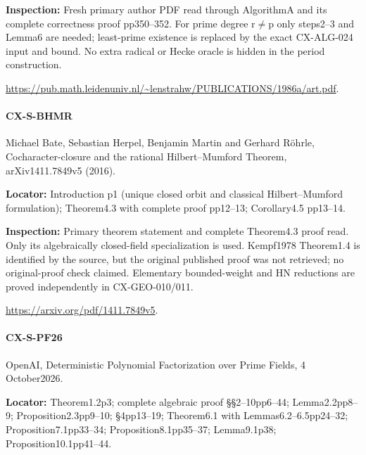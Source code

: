 \documentclass[11pt,a4paper]{article}
\begin{document}
\textbf{Inspection:} Fresh primary author PDF read through AlgorithmA and its complete correctness proof pp350–\allowbreak{}352.\allowbreak{} For prime degree r\ensuremath{\ne}p only steps2–\allowbreak{}3 and Lemma6 are needed; least-prime existence is replaced by the exact CX-ALG-024 input and bound.\allowbreak{} No extra radical or Hecke oracle is hidden in the period construction.\allowbreak{}

\url{https://pub.math.leidenuniv.nl/~lenstrahw/PUBLICATIONS/1986a/art.pdf}.

\paragraph{CX-S-BHMR} Michael Bate, Sebastian Herpel, Benjamin Martin and Gerhard Röhrle, Cocharacter-closure and the rational Hilbert–\allowbreak{}Mumford Theorem, arXiv1411.\allowbreak{}7849v5 (2016).

\textbf{Locator:} Introduction p1 (unique closed orbit and classical Hilbert–\allowbreak{}Mumford formulation); Theorem4.\allowbreak{}3 with complete proof pp12–\allowbreak{}13; Corollary4.\allowbreak{}5 pp13–\allowbreak{}14.

\textbf{Inspection:} Primary theorem statement and complete Theorem4.\allowbreak{}3 proof read.\allowbreak{} Only its algebraically closed-field specialization is used.\allowbreak{} Kempf1978 Theorem1.\allowbreak{}4 is identified by the source, but the original published proof was not retrieved; no original-proof check claimed.\allowbreak{} Elementary bounded-weight and HN reductions are proved independently in CX-GEO-010/\allowbreak{}011.\allowbreak{}

\url{https://arxiv.org/pdf/1411.7849v5}.

\paragraph{CX-S-PF26} OpenAI, Deterministic Polynomial Factorization over Prime Fields, 4 October2026.

\textbf{Locator:} Theorem1.\allowbreak{}2p3; complete algebraic proof §§2–\allowbreak{}10pp6–\allowbreak{}44; Lemma2.\allowbreak{}2pp8–\allowbreak{}9; Proposition2.\allowbreak{}3pp9–\allowbreak{}10; §4pp13–\allowbreak{}19; Theorem6.\allowbreak{}1 with Lemmas6.\allowbreak{}2–\allowbreak{}6.\allowbreak{}5pp24–\allowbreak{}32; Proposition7.\allowbreak{}1pp33–\allowbreak{}34; Proposition8.\allowbreak{}1pp35–\allowbreak{}37; Lemma9.\allowbreak{}1p38; Proposition10.\allowbreak{}1pp41–\allowbreak{}44.
\end{document}
